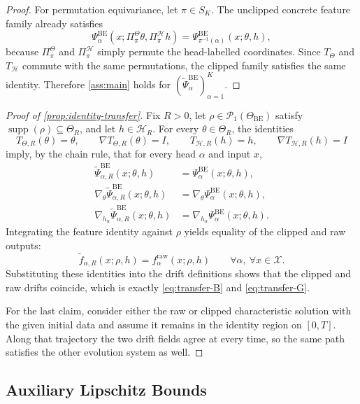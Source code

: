 \documentclass[11pt]{article}
\theoremstyle{definition}
\newcommand{\PP}{\mathcal{P}}
\begin{document}
\begin{proof}
For permutation equivariance, let $\pi\in S_K$. The unclipped concrete feature
family already satisfies
\[
  \Psi_\alpha^{\mathrm{BE}}(x;\Pi_\pi^\Theta\theta,\Pi_\pi^\mathcal H h)
  =
  \Psi_{\pi^{-1}(\alpha)}^{\mathrm{BE}}(x;\theta,h),
\]
because $\Pi_\pi^\Theta$ and $\Pi_\pi^\mathcal H$ simply permute the
head-labelled coordinates. Since $T_\Theta$ and $T_\mathcal H$ commute with the
same permutations, the clipped family satisfies the same identity. Therefore
\cref{ass:main} holds for
\(
  (\widetilde\Psi_\alpha^{\mathrm{BE}})_{\alpha=1}^K
\).
\end{proof}

\begin{proof}[Proof of \cref{prop:identity-transfer}]
Fix $R>0$, let $\rho\in\PP_1(\Theta_{\mathrm{BE}})$ satisfy
$\operatorname{supp}(\rho)\subseteq\Theta_R$, and let $h\in\mathcal H_R$. For every
$\theta\in\Theta_R$, the identities
\[
  T_{\Theta,R}(\theta)=\theta,
  \qquad
  \nabla T_{\Theta,R}(\theta)=I,
  \qquad
  T_{\mathcal H,R}(h)=h,
  \qquad
  \nabla T_{\mathcal H,R}(h)=I
\]
imply, by the chain rule, that for every head $\alpha$ and input $x$,
\[
\begin{aligned}
  \widetilde\Psi_{\alpha,R}^{\mathrm{BE}}(x;\theta,h)
  &=
  \Psi_\alpha^{\mathrm{BE}}(x;\theta,h),\\
  \nabla_\theta\widetilde\Psi_{\alpha,R}^{\mathrm{BE}}(x;\theta,h)
  &=
  \nabla_\theta\Psi_\alpha^{\mathrm{BE}}(x;\theta,h),\\
  \nabla_{h_\alpha}\widetilde\Psi_{\alpha,R}^{\mathrm{BE}}(x;\theta,h)
  &=
  \nabla_{h_\alpha}\Psi_\alpha^{\mathrm{BE}}(x;\theta,h).
\end{aligned}
\]
Integrating the feature identity against $\rho$ yields equality of the clipped
and raw outputs:
\[
  \widetilde f_{\alpha,R}(x;\rho,h)
  =
  f_\alpha^{\mathrm{raw}}(x;\rho,h)
  \qquad
  \forall \alpha,\ \forall x\in\mathcal X.
\]
Substituting these identities into the drift definitions shows that the clipped
and raw drifts coincide, which is exactly \eqref{eq:transfer-B} and
\eqref{eq:transfer-G}.

For the last claim, consider either the raw or clipped characteristic solution
with the given initial data and assume it remains in the identity region on
$[0,T]$. Along that trajectory the two drift fields agree at every time, so the
same path satisfies the other evolution system as well.
\end{proof}

\subsection{Auxiliary Lipschitz Bounds}
\end{document}
